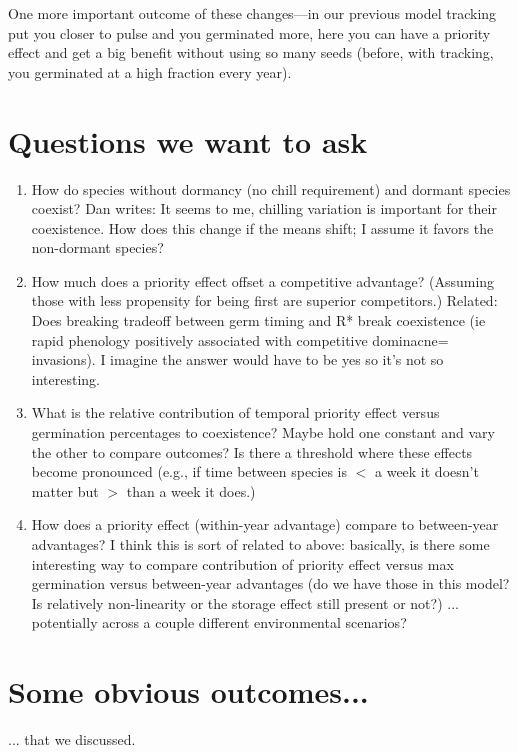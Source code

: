 \documentclass[11pt,letter]{article}
\begin{document}
One more important outcome of these changes---in our previous model tracking put you closer to pulse and you germinated more, here you can have a priority effect and get a big benefit without using so many seeds (before, with tracking, you germinated at a high fraction every year). 

\section{Questions we want to ask}

\begin{enumerate}
\item How do species without dormancy (no chill requirement) and dormant species coexist? Dan writes: It seems to me, chilling variation is important for their coexistence. How does this change if the means shift; I assume it favors the non-dormant species?
\item How much does a priority effect offset a competitive advantage? (Assuming those with less propensity for being first are superior competitors.) Related: Does breaking tradeoff between germ timing and R* break coexistence (ie rapid phenology positively associated with competitive dominacne= invasions). I imagine the answer would have to be yes so it's not so interesting.
\item What is the relative contribution of temporal priority effect versus germination percentages to coexistence? Maybe hold one constant and vary the other to compare outcomes? Is there a threshold where these effects become pronounced (e.g., if time between species is $<$ a week it doesn't matter but $>$ than a week it does.)
\item How does a priority effect (within-year advantage) compare to between-year advantages? I think this is sort of related to above: basically, is there some interesting way to compare contribution of priority effect versus max germination versus between-year advantages (do we have those in this model? Is relatively non-linearity or the storage effect still present or not?) ... potentially across a couple different environmental scenarios?
\end{enumerate}

\section{Some obvious outcomes...}
... that we discussed.
\end{document}
